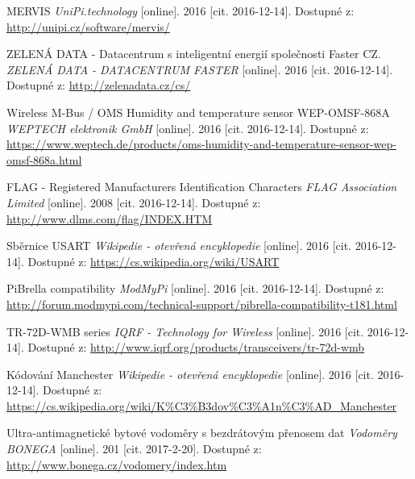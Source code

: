 \begin{literatura}{99}
 MERVIS \textit{UniPi.technology} [online]. 2016 [cit. 2016-12-14]. Dostupné z: \url{http://unipi.cz/software/mervis/}

 ZELENÁ DATA - Datacentrum s inteligentní energií společnosti Faster CZ. \textit{ZELENÁ DATA - DATACENTRUM FASTER} [online]. 2016 [cit. 2016-12-14]. Dostupné z: \url{http://zelenadata.cz/cs/}
				
 Wireless M-Bus / OMS Humidity and temperature sensor WEP-OMSF-868A \textit{WEPTECH elektronik GmbH} [online]. 2016 [cit. 2016-12-14]. Dostupné z: \url{https://www.weptech.de/products/oms-humidity-and-temperature-sensor-wep-omsf-868a.html}

 	 	FLAG - Registered Manufacturers Identification Characters \textit{FLAG Association Limited} [online]. 2008 [cit. 2016-12-14]. Dostupné z: \url{http://www.dlms.com/flag/INDEX.HTM}

 Sběrnice USART \textit{Wikipedie - otevřená encyklopedie} [online]. 2016 [cit. 2016-12-14]. Dostupné z: \url{https://cs.wikipedia.org/wiki/USART}

 PiBrella compatibility \textit{ModMyPi} [online]. 2016 [cit. 2016-12-14]. Dostupné z: \url{http://forum.modmypi.com/technical-support/pibrella-compatibility-t181.html}

 TR-72D-WMB series \textit{IQRF - Technology for Wireless} [online]. 2016 [cit. 2016-12-14]. Dostupné z: \url{http://www.iqrf.org/products/transceivers/tr-72d-wmb}

 Kódování Manchester \textit{Wikipedie - otevřená encyklopedie} [online]. 2016 [cit. 2016-12-14]. Dostupné z: \url{https://cs.wikipedia.org/wiki/K\%C3\%B3dov\%C3\%A1n\%C3\%AD\_Manchester}

 Ultra-antimagnetické bytové vodoměry s bezdrátovým přenosem dat \textit{Vodoměry BONEGA} [online]. 201 [cit. 2017-2-20]. Dostupné z: \url{http://www.bonega.cz/vodomery/index.htm}


\end{literatura}

